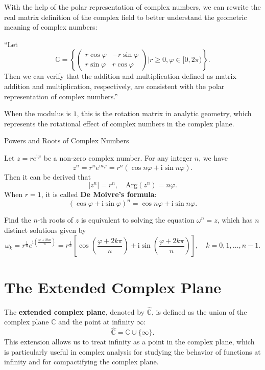 \begin{remark}
    With the help of the polar representation of complex numbers, we can rewrite the real matrix definition of the complex field
    to better understand the geometric meaning of complex numbers:
    
    ``Let
    \[
    \mathbb{C} = \left\{\begin{pmatrix} r\cos \varphi & -r\sin \varphi \\ r\sin \varphi & r\cos \varphi \end{pmatrix} | r \geq 0, \varphi \in [0, 2\pi) \right\}.
    \]
    Then we can verify that the addition and multiplication defined as matrix addition and multiplication, respectively, 
    are consistent with the polar representation of complex numbers.''

    When the modulus is \(1\), this is the rotation matrix in analytic geometry, 
    which represents the rotational effect of complex numbers in the complex plane.
\end{remark}

\begin{leftbarTitle}{Powers and Roots of Complex Numbers}\end{leftbarTitle} %
Let \(z = r e^{\mathrm{i} \varphi}\) be a non-zero complex number. 
For any integer \(n\), we have
\[
    z^n = r^n e^{\mathrm{i} n \varphi} = r^n (\cos n\varphi + \mathrm{i} \sin n\varphi).
\]
Then it can be derived that
\[
    \left| z^{n} \right| = r^{n}, \quad \mathrm{Arg}(z^{n}) = n \varphi.
\]
When \(r=1\), it is called \textbf{De Moivre's formula}:
\[
(\cos \varphi + \mathrm{i} \sin \varphi)^n = \cos n\varphi + \mathrm{i} \sin n\varphi.
\]

Find the \(n\)-th roots of \(z\) is equivalent to solving the equation \(\omega^n = z\),
which has \(n\) distinct solutions given by
\[
    \omega_k = r^{\frac{1}{n}} e^{\mathrm{i} \left(\frac{\varphi + 2k\pi}{n}\right)} = r^{\frac{1}{n}} \left[\cos \left(\frac{\varphi + 2k\pi}{n}\right) + \mathrm{i} \sin \left(\frac{\varphi + 2k\pi}{n}\right)\right], \quad k = 0, 1, \ldots, n-1.
\]
\section{The Extended Complex Plane} %

The \textbf{extended complex plane}, denoted by \(\hat{\mathbb{C}}\), 
is defined as the union of the complex plane \(\mathbb{C}\) and the point at infinity \(\infty\):
\[
    \hat{\mathbb{C}} = \mathbb{C} \cup \{\infty\}.
\]
This extension allows us to treat infinity as a point in the complex plane,
which is particularly useful in complex analysis for 
studying the behavior of functions at infinity and for compactifying the complex plane.

